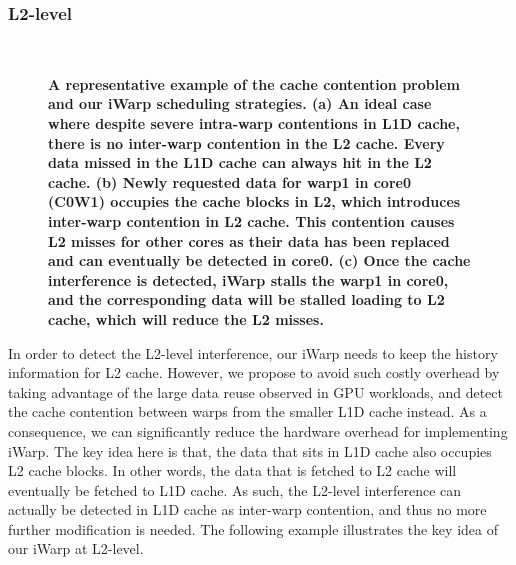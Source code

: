 \documentclass{sigplanconf}
\begin{document}
\subsubsection{L2-level}


\begin{figure*}
  \begin{center}
    \mbox{
       \quad
      \quad
    }
\end{center}
\vspace{-10pt}
\begin{center}
\caption{\textbf{A representative example of the cache contention problem and our iWarp scheduling strategies. (a) An ideal case where despite severe intra-warp contentions in L1D cache, there is no inter-warp contention in the L2 cache. Every data missed in the L1D cache can always hit in the L2 cache. (b) Newly requested data for warp1 in core0 (C0W1) occupies the cache blocks in L2, which introduces inter-warp contention in L2 cache. This contention causes L2 misses for other cores as their data has been replaced and can eventually be detected in core0. (c) Once the cache interference is detected, iWarp stalls the warp1 in core0, and the corresponding data will be stalled loading to L2 cache, which will reduce the L2 misses. \label{fig:l2}}}
\end{center}
\vspace*{-15pt}
\end{figure*}

In order to detect the L2-level interference, our iWarp needs to keep the history information for L2 cache. However, we propose to avoid such costly overhead by taking advantage of the large data reuse observed in GPU workloads, and detect the cache contention between warps from the smaller L1D cache instead. As a consequence, we can significantly reduce the hardware overhead for implementing iWarp. The key idea here is that, the data that sits in L1D cache also occupies L2 cache blocks. In other words, the data that is fetched to L2 cache will eventually be fetched to L1D cache. As such, the L2-level interference can actually be detected in L1D cache as inter-warp contention, and thus no more further modification is needed. The following example illustrates the key idea of our iWarp at L2-level.
\end{document}

